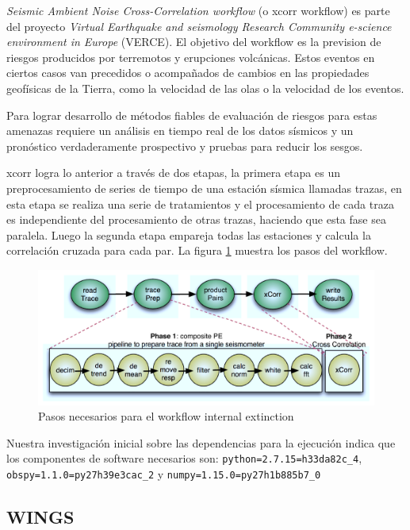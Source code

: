 \textit{Seismic Ambient Noise Cross-Correlation workflow} (o xcorr workflow) es parte del proyecto \textit{Virtual Earthquake and seismology Research Community e-science environment in Europe} (VERCE). 
El objetivo del workflow es la prevision de riesgos producidos por terremotos y erupciones volcánicas. Estos eventos en ciertos casos van precedidos o acompañados de cambios en las propiedades geofísicas de la Tierra, como la velocidad de las olas o la velocidad de los eventos. 

Para lograr desarrollo de métodos fiables de evaluación de riesgos para estas amenazas requiere un análisis en tiempo real de los datos sísmicos y un pronóstico verdaderamente prospectivo y pruebas para reducir los sesgos.

xcorr logra lo anterior a través de dos etapas, la primera etapa es un preprocesamiento de series de tiempo de una estación sísmica llamadas trazas, en esta etapa se realiza una serie de tratamientos y el procesamiento de cada traza es independiente del procesamiento de otras trazas, haciendo que esta fase sea paralela. 
Luego la segunda etapa empareja todas las estaciones y calcula la correlación cruzada para cada par. La figura \ref{fig:xcorr} muestra los pasos del workflow.


\begin{figure}[t]
\centering
\includegraphics[width=.8\textwidth]{Figures/xcorr}
\caption{Pasos necesarios para el workflow internal extinction}\label{fig:xcorr}
\end{figure}


Nuestra investigación inicial sobre las dependencias para la ejecución indica que los componentes de software necesarios son: \verb|python=2.7.15=h33da82c_4|, \verb|obspy=1.1.0=py27h39e3cac_2| y \verb|numpy=1.15.0=py27h1b885b7_0|



\subsection{WINGS}

